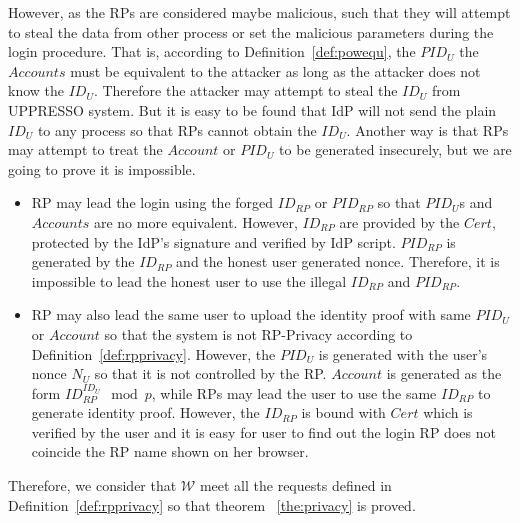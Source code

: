 However, as the RPs are considered maybe malicious, such that they will attempt to steal the data from other process or set the malicious parameters during the login procedure. That is, according to Definition~\ref{def:powequ}, the $PID_U$ the $Accounts$ must be equivalent to the attacker as long as the attacker does not know the $ID_U$. Therefore the attacker may attempt to steal the $ID_U$ from UPPRESSO system.
But it is easy to be found that IdP will not send the plain $ID_U$ to any process so that RPs cannot obtain the $ID_U$. Another way is that RPs may attempt to treat the $Account$ or $PID_U$ to be generated insecurely, but we are going to prove it is impossible.
\begin{itemize}
\item RP may lead the login using the forged $ID_{RP}$ or $PID_{RP}$ so that $PID_U$s and $Accounts$ are no more equivalent. However, $ID_{RP}$ are provided by the $Cert$, protected by the IdP's signature and verified by IdP script.  $PID_{RP}$ is generated by the $ID_{RP}$ and the honest user generated nonce. Therefore, it is impossible to lead the honest user to use the illegal $ID_{RP}$ and $PID_{RP}$.
\item RP may also lead the same user to upload the identity proof with same $PID_U$ or $Account$ so that the system is not RP-Privacy according to Definition~\ref{def:rpprivacy}. However, the $PID_U$ is generated with the user's nonce $N_U$ so that it is not controlled by the RP. $Account$ is generated as the form $ID_{RP}^{ID_U} \mod p$, while RPs may lead the user to use the same $ID_{RP}$ to generate identity proof. However, the $ID_{RP}$ is bound with $Cert$ which is verified by the user and it is easy for user to find out the login RP  does not coincide the RP name shown on her browser. 
\end{itemize}

Therefore, we consider that $\mathcal{W}$ meet all the requests defined in Definition~\ref{def:rpprivacy} so that theorem ~\ref{the:privacy} is proved. 


